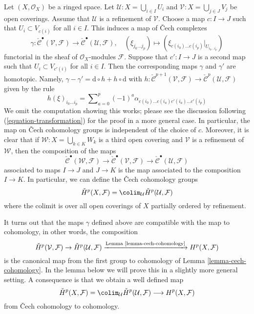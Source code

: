 \noindent
Let $(X, \mathcal{O}_X)$ be a ringed space. Let
$\mathcal{U} : X = \bigcup_{i \in I} U_i$ and
$\mathcal{V} : X = \bigcup_{j \in J} V_j$ be open coverings.
Assume that $\mathcal{U}$ is a refinement of $\mathcal{V}$.
Choose a map $c : I \to J$ such that $U_i \subset V_{c(i)}$
for all $i \in I$. This induces a map of {\v C}ech complexes
$$
\gamma :
\check{\mathcal{C}}^\bullet(\mathcal{V}, \mathcal{F})
\longrightarrow
\check{\mathcal{C}}^\bullet(\mathcal{U}, \mathcal{F}),
\quad
(\xi_{j_0 \ldots j_p})
\longmapsto
(\xi_{c(i_0) \ldots c(i_p)}|_{U_{i_0 \ldots i_p}})
$$
functorial in the sheaf of $\mathcal{O}_X$-modules $\mathcal{F}$.
Suppose that $c' : I \to J$ is a second map such that
$U_i \subset V_{c'(i)}$ for all $i \in I$. Then the corresponding maps
$\gamma$ and $\gamma'$ are homotopic. Namely,
$\gamma - \gamma' = \text{d} \circ h + h \circ \text{d}$
with
$h : \check{\mathcal{C}}^{p + 1}(\mathcal{V}, \mathcal{F}) \to
\check{\mathcal{C}}^p(\mathcal{U}, \mathcal{F})$
given by the rule
$$
h(\xi)_{i_0 \ldots i_p} =
\sum\nolimits_{a = 0}^{p}
(-1)^a
\alpha_{c(i_0)\ldots c(i_a) c'(i_a) \ldots c'(i_p)}
$$
We omit the computation showing this works; please see the discussion
following (\ref{equation-transformation}) for the proof in a more general
case. In particular, the map on {\v C}ech cohomology groups is independent
of the choice of $c$. Moreover, it is clear that if
$\mathcal{W} : X = \bigcup_{k \in K} W_k$ is a third open covering
and $\mathcal{V}$ is a refinement of $\mathcal{W}$, then the composition
of the maps
$$
\check{\mathcal{C}}^\bullet(\mathcal{W}, \mathcal{F})
\longrightarrow
\check{\mathcal{C}}^\bullet(\mathcal{V}, \mathcal{F})
\longrightarrow
\check{\mathcal{C}}^\bullet(\mathcal{U}, \mathcal{F})
$$
associated to maps $I \to J$ and $J \to K$ is the map associated
to the composition $I \to K$.
In particular, we can define the {\v C}ech cohomology
groups
$$
\check{H}^p(X, \mathcal{F}) =
\colim_\mathcal{U} \check{H}^p(\mathcal{U}, \mathcal{F})
$$
where the colimit is over all open coverings of $X$ partially ordered
by refinement.

\medskip\noindent
It turns out that the maps $\gamma$ defined above are compatible with
the map to cohomology, in other words, the composition
$$
\check{H}^p(\mathcal{V}, \mathcal{F}) \to
\check{H}^p(\mathcal{U}, \mathcal{F})
\xrightarrow{\text{Lemma \ref{lemma-cech-cohomology}}}
H^p(X, \mathcal{F})
$$
is the canonical map from the first group to cohomology of
Lemma \ref{lemma-cech-cohomology}. 
In the lemma below we will prove this in a slightly more general
setting. A consequence is that we obtain a well defined map
\begin{equation}
\label{equation-cech-to-cohomology}
\check{H}^p(X, \mathcal{F}) =
\colim_\mathcal{U} \check{H}^p(\mathcal{U}, \mathcal{F})
\longrightarrow
H^p(X, \mathcal{F})
\end{equation}
from {\v C}ech cohomology to cohomology.

